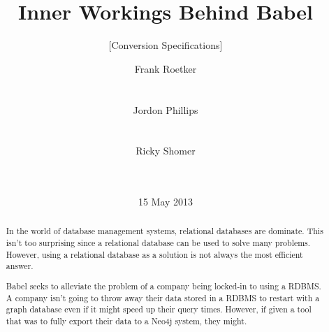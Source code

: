 \documentclass{acm_proc_article-sp}
\begin{document}
\lstset{language=SQL}


\title{Inner Workings Behind Babel
}
\subtitle{[Conversion Specifications]}

\author{
\alignauthor
Frank Roetker
       \\
       \\
       \\
\alignauthor
Jordon Phillips
       \\
       \\
       \\
\alignauthor Ricky Shomer
       \\
       \\
       \\
}
\date{15 May 2013}

\maketitle
\begin{abstract}
In the world of database management systems, relational databases are dominate. This isn't too surprising since a relational database can be used to solve many problems. However, using a relational database as a solution is not always the most efficient answer.

Babel seeks to alleviate the problem of a company being locked-in to using a RDBMS. A company isn't going to throw away their data stored in a RDBMS to restart with a graph database even if it might speed up their query times. However, if given a tool that was to fully export their data to a Neo4j system, they might. 
\end{abstract}



\end{document}
